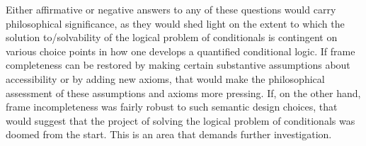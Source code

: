 \documentclass[12pt]{article}
\begin{document}
Either affirmative or negative answers to any of these questions would carry philosophical significance, as they would shed light on the extent to which the solution to/solvability of the logical problem of conditionals is contingent on various choice points in how one develops a quantified conditional logic. 
If frame completeness can be restored by making certain substantive assumptions about accessibility or by adding new axioms, that would make the philosophical assessment of these assumptions and axioms more pressing. 
If, on the other hand, frame incompleteness was fairly robust to such semantic design choices, that would suggest that the project of solving the logical problem of conditionals was doomed from the start. 
This is an area that demands further investigation. 




\end{document}
